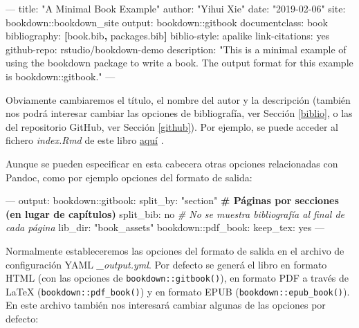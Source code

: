 \documentclass[]{book}
\newenvironment{Shaded}{\begin{snugshade}}{\end{snugshade}}
\newcommand{\KeywordTok}[1]{\textcolor[rgb]{0.13,0.29,0.53}{\textbf{#1}}}
\newcommand{\StringTok}[1]{\textcolor[rgb]{0.31,0.60,0.02}{#1}}
\newcommand{\CommentTok}[1]{\textcolor[rgb]{0.56,0.35,0.01}{\textit{#1}}}
\newcommand{\OtherTok}[1]{\textcolor[rgb]{0.56,0.35,0.01}{#1}}
\newcommand{\FunctionTok}[1]{\textcolor[rgb]{0.00,0.00,0.00}{#1}}
\newcommand{\AttributeTok}[1]{\textcolor[rgb]{0.77,0.63,0.00}{#1}}
\newcommand{\ErrorTok}[1]{\textcolor[rgb]{0.64,0.00,0.00}{\textbf{#1}}}
\newcommand{\NormalTok}[1]{#1}
\theoremstyle{definition}
\theoremstyle{definition}
\theoremstyle{definition}
\theoremstyle{remark}
\begin{document}
\begin{Shaded}
\begin{Highlighting}[]
\OtherTok{--- }
\FunctionTok{title:}\AttributeTok{ }\StringTok{"A Minimal Book Example"}
\FunctionTok{author:}\AttributeTok{ }\StringTok{"Yihui Xie"}
\FunctionTok{date:}\AttributeTok{ }\StringTok{"2019-02-06"}
\FunctionTok{site:}\AttributeTok{ bookdown::bookdown_site}
\FunctionTok{output:}\AttributeTok{ bookdown::gitbook}
\FunctionTok{documentclass:}\AttributeTok{ book}
\FunctionTok{bibliography:}\AttributeTok{ }\KeywordTok{[}\NormalTok{book.bib}\KeywordTok{,}\NormalTok{ packages.bib}\KeywordTok{]}
\FunctionTok{biblio-style:}\AttributeTok{ apalike}
\FunctionTok{link-citations:}\AttributeTok{ yes}
\FunctionTok{github-repo:}\AttributeTok{ rstudio/bookdown-demo}
\FunctionTok{description:}\AttributeTok{ }\StringTok{"This is a minimal example of using the bookdown package to write a book.}
\StringTok{The output format for this example is bookdown::gitbook."}
\OtherTok{---}
\end{Highlighting}
\end{Shaded}

Obviamente cambiaremos el título, el nombre del autor y la descripción
(también nos podrá interesar cambiar las opciones de bibliografía, ver
Sección \ref{biblio}, o las del repositorio GitHub, ver Sección
\ref{github}). Por ejemplo, se puede acceder al fichero \emph{index.Rmd}
de este libro
\href{https://github.com/rubenfcasal/bookdown_intro/raw/master/index.Rmd}{aquí}
.

Aunque se pueden especificar en esta cabecera otras opciones
relacionadas con Pandoc, como por ejemplo opciones del formato de
salida:

\begin{Shaded}
\begin{Highlighting}[]
\OtherTok{---}
\FunctionTok{output:}
  \FunctionTok{bookdown:}\AttributeTok{:gitbook:}
    \FunctionTok{split_by:}\AttributeTok{ }\StringTok{"section"}\ErrorTok{       # Páginas por secciones (en lugar de capítulos)}
    \FunctionTok{split_bib:}\AttributeTok{ no             }\CommentTok{# No se muestra bibliografía al final de cada página}
    \FunctionTok{lib_dir:}\AttributeTok{ }\StringTok{"book_assets"}
  \FunctionTok{bookdown:}\AttributeTok{:pdf_book:}
    \FunctionTok{keep_tex:}\AttributeTok{ yes}
\OtherTok{---}
\end{Highlighting}
\end{Shaded}

Normalmente estableceremos las opciones del formato de salida en el
archivo de configuración YAML \emph{\_output.yml}. Por defecto se generá
el libro en formato HTML (con las opciones de
\texttt{bookdown::gitbook()}), en formato PDF a través de LaTeX
(\texttt{bookdown::pdf\_book()}) y en formato EPUB
(\texttt{bookdown::epub\_book()}). En este archivo también nos
interesará cambiar algunas de las opciones por defecto:
\end{document}
